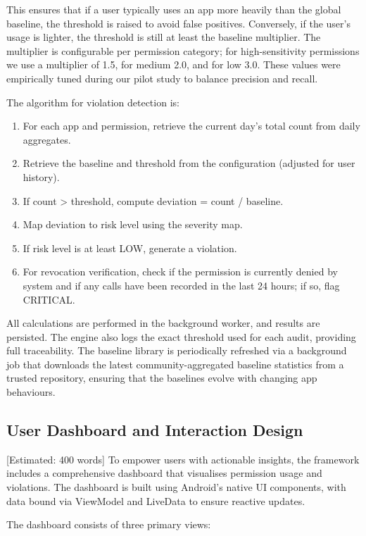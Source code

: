 This ensures that if a user typically uses an app more heavily than the global baseline, the threshold is raised to avoid false positives. Conversely, if the user's usage is lighter, the threshold is still at least the baseline multiplier. The multiplier is configurable per permission category; for high-sensitivity permissions we use a multiplier of 1.5, for medium 2.0, and for low 3.0. These values were empirically tuned during our pilot study to balance precision and recall.

The algorithm for violation detection is:

\begin{enumerate}
\item For each app and permission, retrieve the current day's total count from daily aggregates.
\item Retrieve the baseline and threshold from the configuration (adjusted for user history).
\item If count > threshold, compute deviation = count / baseline.
\item Map deviation to risk level using the severity map.
\item If risk level is at least LOW, generate a violation.
\item For revocation verification, check if the permission is currently denied by system and if any calls have been recorded in the last 24 hours; if so, flag CRITICAL.
\end{enumerate}

All calculations are performed in the background worker, and results are persisted. The engine also logs the exact threshold used for each audit, providing full traceability. The baseline library is periodically refreshed via a background job that downloads the latest community-aggregated baseline statistics from a trusted repository, ensuring that the baselines evolve with changing app behaviours.

\subsection{User Dashboard and Interaction Design} [Estimated: 400 words]
To empower users with actionable insights, the framework includes a comprehensive dashboard that visualises permission usage and violations. The dashboard is built using Android's native UI components, with data bound via ViewModel and LiveData to ensure reactive updates.

The dashboard consists of three primary views:

